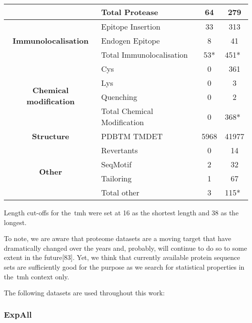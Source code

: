 \begin{table}[htbp]
{\begin{tabular}{cp{5em}cp{5em}}
\cmidrule{2-4}          & Total Protease & 64    & \multicolumn{1}{c}{279} \\
    \midrule
    \multicolumn{1}{c}{\multirow{3}[6]{*}{\textbf{Immunolocalisation}}} & Epitope Insertion & 33    & \multicolumn{1}{c}{313} \\
\cmidrule{2-4}          & Endogen Epitope & 8     & \multicolumn{1}{c}{41} \\
\cmidrule{2-4}          & Total Immunolocalisation & \multicolumn{1}{p{5em}}{53*} & 451* \\
    \midrule
    \multicolumn{1}{c}{\multirow{4}[8]{*}{\textbf{Chemical modification}}} & Cys   & 0     & \multicolumn{1}{c}{361} \\
\cmidrule{2-4}          & Lys   & 0     & \multicolumn{1}{c}{3} \\
\cmidrule{2-4}          & Quenching & 0     & \multicolumn{1}{c}{2} \\
\cmidrule{2-4}          & Total Chemical Modification & 0     & 368* \\
    \midrule
    \multicolumn{1}{p{5em}}{\textbf{Structure}} & PDBTM TMDET & 5968  & \multicolumn{1}{c}{41977} \\
    \midrule
    \multicolumn{1}{c}{\multirow{4}[8]{*}{\textbf{Other}}} & Revertants & 0     & \multicolumn{1}{c}{14} \\
\cmidrule{2-4}          & SeqMotif & 2     & \multicolumn{1}{c}{32} \\
\cmidrule{2-4}          & Tailoring & 1     & \multicolumn{1}{c}{67} \\
\cmidrule{2-4}          & Total other & 3     & 115* \\
    \bottomrule
    \end{tabular}%
    }
   \label{table:topdbevidence}

\end{table}%

Length cut-offs for the~\gls{tmh} were set at 16 as the shortest length and 38 as the longest.

To note, we are aware that proteome datasets are a moving target that have dramatically changed over the years and, probably, will continue to do so to some extent in the future[83].
Yet, we think that currently available protein sequence sets are sufficiently good for the purpose as we search for statistical properties in the~\gls{tmh} context only.

The following datasets are used throughout this work:

\subsubsection{ExpAll}

